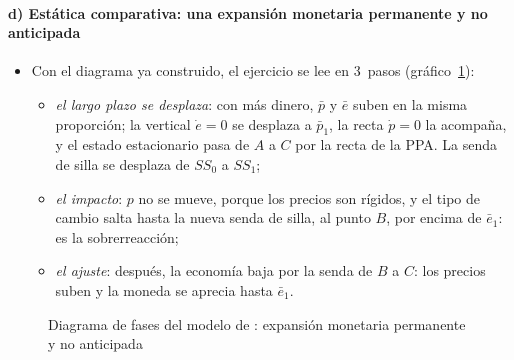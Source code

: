 \documentclass[11pt]{article}
\begin{document}
\paragraph{d) Estática comparativa: una expansión monetaria permanente y no anticipada}
\begin{itemize}
\item Con el diagrama ya construido, el ejercicio se lee en 3~pasos (gráfico~\ref{fig:dornbusch-fases}):
  \begin{itemize}
  \item \emph{el largo plazo se desplaza}: con más dinero, $\bar p$ y $\bar e$ suben en la misma proporción; la vertical $\dot e=0$ se desplaza a $\bar p_1$, la recta $\dot p=0$ la acompaña, y el estado estacionario pasa de $A$ a $C$ por la recta de la PPA. La senda de silla se desplaza de $SS_0$ a $SS_1$;
  \item \emph{el impacto}: $p$ no se mueve, porque los precios son rígidos, y el tipo de cambio salta hasta la nueva senda de silla, al punto $B$, por encima de $\bar e_1$: es la sobrerreacción;
  \item \emph{el ajuste}: después, la economía baja por la senda de $B$ a $C$: los precios suben y la moneda se aprecia hasta $\bar e_1$. \findemo
  \end{itemize}
\end{itemize}

\begin{figure}[H]
\centering
\caption{Diagrama de fases del modelo de : expansión monetaria permanente y no anticipada}\label{fig:dornbusch-fases}
\end{figure}
\end{document}
